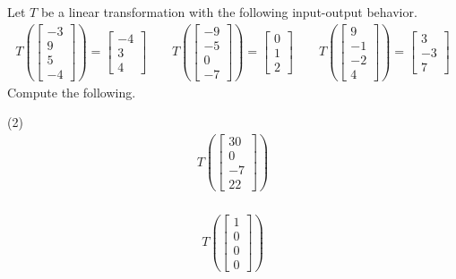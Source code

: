 Let $T$ be a linear transformation with the following input-output
behavior.
\begin{align*}
  T
  \left(
  \begin{bmatrix}
    -3 \\ 9 \\ 5 \\ -4
  \end{bmatrix}
  \right)
  =
  \begin{bmatrix}
    -4 \\ 3 \\ 4
  \end{bmatrix}
  \qquad
  T
  \left(
  \begin{bmatrix}
    -9 \\ -5 \\ 0 \\ -7
  \end{bmatrix}
  \right)
  =
  \begin{bmatrix}
    0 \\ 1 \\ 2
  \end{bmatrix}
  \qquad
  T
  \left(
  \begin{bmatrix}
    9 \\ -1 \\ -2 \\ 4
  \end{bmatrix}
  \right)
  =
  \begin{bmatrix}
    3 \\ -3 \\ 7
  \end{bmatrix}
\end{align*}
Compute the following.
\begin{tasks}[resume, style=enumerate](2)
\task \faCalculator \
  \begin{align*}
    T
    \left(
    \begin{bmatrix}
      30 \\ 0 \\ -7 \\ 22
    \end{bmatrix}
    \right)
  \end{align*}
\task \faCalculator \
  \begin{align*}
    T
    \left(
    \begin{bmatrix}
      1 \\ 0 \\ 0 \\ 0
    \end{bmatrix}
    \right)
  \end{align*}
\end{tasks}
